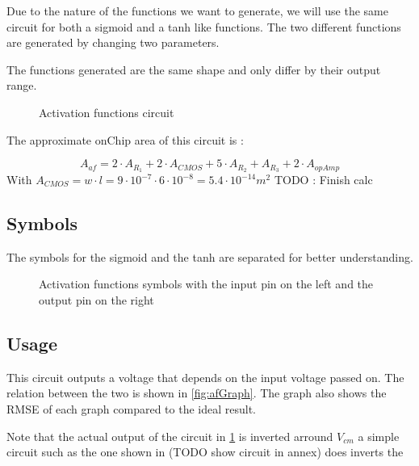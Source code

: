 Due to the nature of the functions we want to generate, we will use the same circuit for both a sigmoid and a \ac{tanh} like functions. The two different functions are generated by changing two parameters.

The functions generated are the same shape and only differ by their output range.

\begin{figure}[H]
  \centering
  
  \caption{Activation functions circuit}
  \label{circt:af}
\end{figure}

The approximate onChip area of this circuit is :

\begin{equation}
  A_{af}=2\cdot A_{R_1} + 2\cdot A_{CMOS} + 5\cdot A_{R_2} + A_{R_3} +2\cdot A_{opAmp}
\end{equation}
With $A_{CMOS} = w\cdot l = 9\cdot 10^{-7} \cdot 6 \cdot 10^{-8} = 5.4 \cdot 10^{-14} m^2$
TODO : Finish calc



\subsection{Symbols}
The symbols for the sigmoid and the \ac{tanh} are separated for better understanding.

\begin{figure}[H]
  \centering
  \hspace*{0.8cm}
  \hfill
  \hspace*{0.8cm}
  \caption{Activation functions symbols with the input pin on the left and the output pin on the right}
  \label{fig:afSymbol}
\end{figure}

\subsection{Usage}

This circuit outputs a voltage that depends on the input voltage passed on. The relation between the two is shown in \cref{fig:afGraph}. The graph also shows the \ac{RMSE} of each graph compared to the ideal result.

Note that the actual output of the circuit in \cref{circt:af} is inverted arround $V_{cm}$ a simple circuit such as the one shown in  (TODO show circuit in annex) does inverts the

